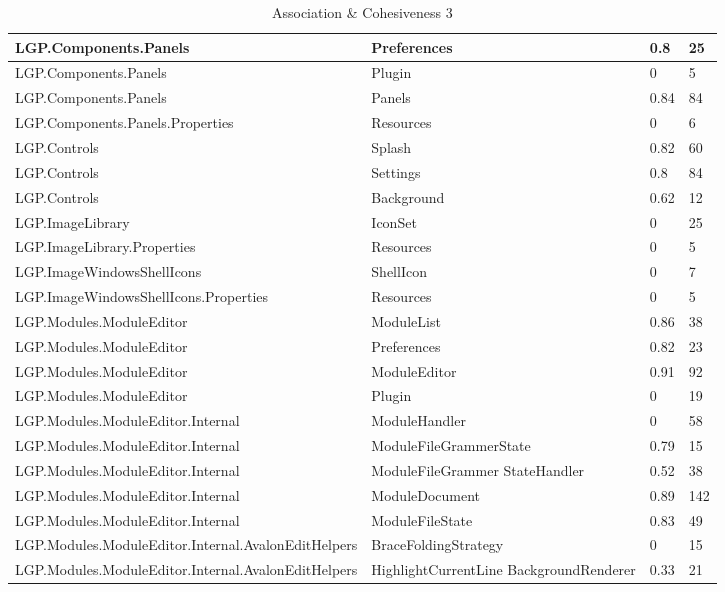 \begin{table}[h!t]
{\begin{tabular}{ | p{85mm} | p{35mm} | p{13mm} | p{14mm}  | }
				LGP.Components.Panels & Preferences & 0.8   & 25 \\ \hline							
				LGP.Components.Panels & Plugin & 0     & 5 \\ \hline
				LGP.Components.Panels & Panels & \cellcolor{ored}0.84  & \cellcolor{ored}84 \\ \hline
				LGP.Components.Panels.Properties & Resources & 0     & 6 \\ \hline
				LGP.Controls & Splash & 0.82  & \cellcolor{ored}60 \\ \hline
				LGP.Controls & Settings & 0.8   & \cellcolor{ored}84 \\ \hline
				LGP.Controls & Background & 0.62  & 12 \\ \hline
				LGP.ImageLibrary & IconSet & 0     & 25 \\ \hline		
				LGP.ImageLibrary.Properties & Resources & 0     & 5 \\ \hline
				LGP.ImageWindowsShellIcons & ShellIcon & 0     & 7 \\ \hline
				LGP.ImageWindowsShellIcons.Properties & Resources & 0     & 5 \\ \hline
				LGP.Modules.ModuleEditor & ModuleList & \cellcolor{ored}0.86  & 38 \\ \hline
				LGP.Modules.ModuleEditor & Preferences & 0.82  & 23 \\ \hline
				LGP.Modules.ModuleEditor & ModuleEditor & \cellcolor{ored}0.91  & \cellcolor{ored}92 \\ \hline
				LGP.Modules.ModuleEditor & Plugin & 0     & 19 \\ \hline
				LGP.Modules.ModuleEditor.Internal & ModuleHandler & 0     & \cellcolor{ored}58 \\ \hline
				LGP.Modules.ModuleEditor.Internal & ModuleFileGrammerState & 0.79  & 15 \\ \hline
				LGP.Modules.ModuleEditor.Internal & ModuleFileGrammer\newline
													StateHandler & 0.52  & 38 \\ \hline
				LGP.Modules.ModuleEditor.Internal & ModuleDocument & \cellcolor{ored}0.89  & \cellcolor{ored}142 \\ \hline
				LGP.Modules.ModuleEditor.Internal & ModuleFileState & 0.83  & \cellcolor{ored}49 \\ \hline
				LGP.Modules.ModuleEditor.Internal.AvalonEditHelpers & BraceFoldingStrategy & 0     & 15 \\ \hline
				LGP.Modules.ModuleEditor.Internal.AvalonEditHelpers & HighlightCurrentLine\newline
																	  BackgroundRenderer & 0.33  & 21 \\ \hline
				\end{tabular}}
				
				\caption{Association \& Cohesiveness 3}			
				\label{tab:AssociationCohesiveness3}
				
			\end{table}
			

